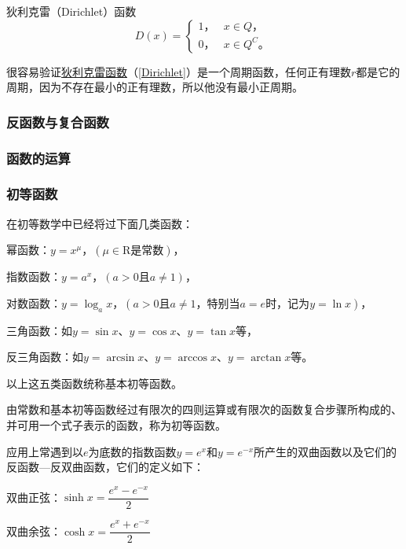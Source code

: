 \begin{definition}
	狄利克雷（Dirichlet）函数
	\begin{equation}\label{Dirichlet}
		D(x) = \left\lbrace 
			\begin{array}{rl}
			1 \text{，} & x \in Q \text{，}\\
			0 \text{，} & x \in Q^C \text{。}
			\end{array}
		\right. 
	\end{equation}
\end{definition}

很容易验证\hyperref[Dirichlet]{狄利克雷函数}（\ref{Dirichlet}）是一个周期函数，任何正有理数$ r $都是它的周期，因为不存在最小的正有理数，所以他没有最小正周期。

\subsubsection{反函数与复合函数}

\subsubsection{函数的运算}

\subsubsection{初等函数}

在初等数学中已经将过下面几类函数：

幂函数：$ y = x^\mu \text{，} (\mu \in \text{R是常数}) $，

指数函数：$ y = a^x \text{，} (a>0 \text{且} a \ne 1) $，

对数函数：$ y = \log_a x \text{，} (a>0 \text{且} a \ne 1\text{，特别当} a = e \text{时，记为} y = \ln x ) $，

三角函数：如$ y = \sin x $、$ y = \cos x $、$ y = \tan x $等，

反三角函数：如$ y = \arcsin x $、$ y = \arccos x $、$ y = \arctan x $等。

以上这五类函数统称基本初等函数。

由常数和基本初等函数经过有限次的四则运算或有限次的函数复合步骤所构成的、并可用一个式子表示的函数，称为初等函数。

应用上常遇到以$ e $为底数的指数函数$ y=e^x $和$ y=e^{-x} $所产生的双曲函数以及它们的反函数---反双曲函数，它们的定义如下：

双曲正弦：$ \sinh x = \dfrac{e^x - e^{-x}}{2} $

双曲余弦：$ \cosh x = \dfrac{e^x + e^{-x}}{2} $

